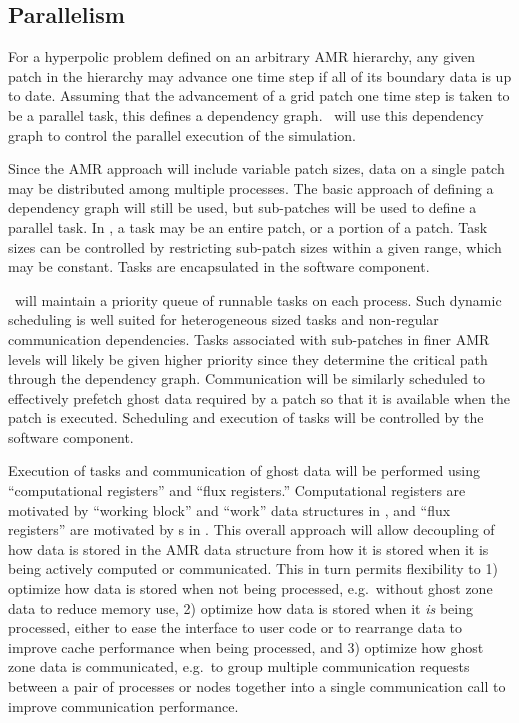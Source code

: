 \documentclass[10pt,twocolumn]{article}
\begin{document}
\subsection{Parallelism} \label{ss:design-parallel}

For a hyperpolic problem defined on an arbitrary AMR hierarchy, any
given patch in the hierarchy may advance one time step if all of its
boundary data is up to date.  Assuming that the advancement of a grid
patch one time step is taken to be a parallel task, this defines a
dependency graph.  \cello\ will use this dependency graph to control
the parallel execution of the simulation.

Since the AMR approach will include variable patch sizes, data on a
single patch may be distributed among multiple processes.  The basic
approach of defining a dependency graph will still be used, but
sub-patches will be used to define a parallel task.  In \cello, a task
may be an entire patch, or a portion of a patch.  Task sizes can be
controlled by restricting sub-patch sizes within a given range, which
may be constant.  Tasks are encapsulated in the  software
component.

\cello\ will maintain a priority queue of runnable tasks on each
process.  Such dynamic scheduling is well suited for heterogeneous
sized tasks and non-regular communication dependencies. Tasks
associated with sub-patches in finer AMR levels will likely be given
higher priority since they determine the critical path through the
dependency graph.  Communication will be similarly scheduled to
effectively prefetch ghost data required by a patch so that it is
available when the patch is executed.  Scheduling and execution of
tasks will be controlled by the  software component.

Execution of tasks and communication of ghost data will be performed
using ``computational registers'' and ``flux registers.''
Computational registers are motivated by ``working block'' and
``work'' data structures in \paramesh, and ``flux registers'' are
motivated by s in \chombo.  This overall
approach will allow decoupling of how data is stored in the AMR data
structure from how it is stored when it is being actively computed or
communicated.  This in turn permits flexibility to 1) optimize how
data is stored when not being processed, e.g.~without ghost zone data
to reduce memory use, 2) optimize how data is stored when it
\textit{is} being processed, either to ease the interface to user code
or to rearrange data to improve cache performance when being
processed, and 3) optimize how ghost zone data is communicated,
e.g.~to group multiple communication requests between a pair of
processes or nodes together into a single communication call to
improve communication performance.
\end{document}

